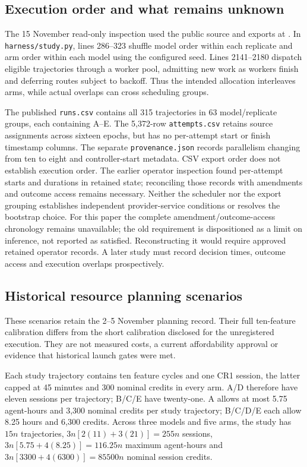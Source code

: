 \FloatBarrier
\subsection{Execution order and what remains unknown}\label{app:scheduling}

The 15 November read-only inspection used the public source and exports at
. In \nolinkurl{harness/study.py}, lines 286--323 shuffle
model order within each replicate and arm order within each model using
the configured seed. Lines 2141--2180 dispatch eligible trajectories through
a worker pool, admitting new work as workers finish and deferring routes
subject to backoff. Thus the intended allocation interleaves arms, while
actual overlaps can cross scheduling groups.

The published \nolinkurl{runs.csv} contains all 315 trajectories in 63
model/replicate groups, each containing A--E. The 5,372-row
\nolinkurl{attempts.csv} retains source assignments across sixteen epochs,
but has no per-attempt start or finish timestamp columns.
The separate \nolinkurl{provenance.json} records parallelism changing from
ten to eight and controller-start metadata. CSV export order does not establish execution order. The earlier operator
inspection found per-attempt starts and durations in retained state;
reconciling those records with amendments and outcome access remains
necessary. Neither the scheduler nor the export grouping establishes
independent provider-service conditions or resolves the bootstrap choice.
For this paper the complete amendment/outcome-access chronology remains
unavailable; the old requirement is dispositioned as a limit on inference,
not reported as satisfied. Reconstructing it would require approved retained
operator records. A later study must record
decision times, outcome access and execution overlaps prospectively.

\subsection{Historical resource planning scenarios}\label{app:resources}

These scenarios retain the 2--5 November planning record. Their full
ten-feature calibration differs from the short calibration disclosed for
the unregistered execution. They are not measured costs, a current
affordability approval or evidence that historical launch gates were met.

Each study trajectory contains ten feature cycles and one CR1 session,
the latter capped at 45 minutes and 300 nominal credits in every arm.
A/D therefore have eleven sessions per trajectory; B/C/E have twenty-one.
A allows at most 5.75 agent-hours and 3,300 nominal credits per study
trajectory; B/C/D/E each allow 8.25 hours and 6,300 credits.
Across three models and five arms, the study has $15n$ trajectories,
$3n[2(11)+3(21)]=255n$ sessions,
$3n[5.75+4(8.25)]=116.25n$ maximum agent-hours and
$3n[3300+4(6300)]=85500n$ nominal session credits.

